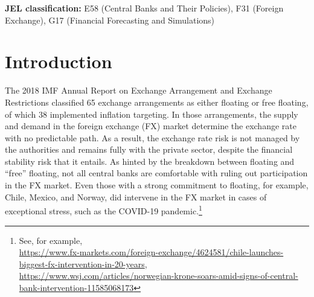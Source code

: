 \documentclass[11pt]{article}
\begin{document}
\medskip

\noindent \textbf{JEL classification:} E58 (Central Banks and Their Policies), F31 (Foreign Exchange), G17 (Financial Forecasting and Simulations)

\thispagestyle{empty} 
\newpage
{}



\begin{NoHyper}  
\tableofcontents
\thispagestyle{empty} 

\listoftables
\thispagestyle{empty} 

\newpage
\listoffigures

\thispagestyle{empty} 
\end{NoHyper}  

\newpage
{} %

\section{Introduction}
\label{sec:introduction}

The 2018 IMF  Annual Report on Exchange Arrangement  and Exchange Restrictions
classified 65  exchange arrangements as  either floating or free  floating, of
which 38 implemented  inflation targeting.  In those  arrangements, the supply
and demand  in the foreign  exchange (FX)  market determine the  exchange rate
with no predictable path.  As a result,  the exchange rate risk is not managed
by the  authorities and  remains fully  with the  private sector,  despite the
financial stability risk  that it entails. As hinted by  the breakdown between
floating  and “free”  floating, not  all  central banks  are comfortable  with
ruling out participation in the FX market. Even those with a strong commitment
to floating, for  example, Chile, Mexico, and Norway, did  intervene in the FX
market   in   cases   of   exceptional    stress,   such   as   the   COVID-19
pandemic.\footnote{See, for example,\\
\url{https://www.fx-markets.com/foreign-exchange/4624581/chile-launches-biggest-fx-intervention-in-20-years},\\
\url{https://www.wsj.com/articles/norwegian-krone-soars-amid-signs-of-central-bank-intervention-11585068173}}\\
\end{document}
